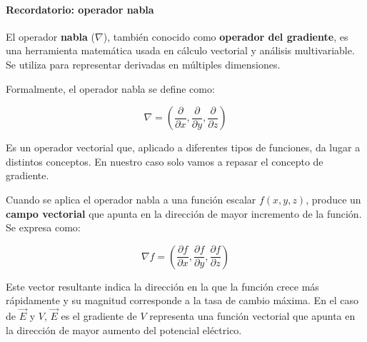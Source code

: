 \paragraph{Recordatorio: operador nabla}

El operador \textbf{nabla} (\(\nabla\)), también conocido como \textbf{operador del gradiente}, es una herramienta matemática usada en cálculo vectorial y análisis multivariable. Se utiliza para representar derivadas en múltiples dimensiones.

Formalmente, el operador nabla se define como:

\[
\nabla = \left( \frac{\partial}{\partial x}, \frac{\partial}{\partial y}, \frac{\partial}{\partial z} \right)
\]

Es un operador vectorial que, aplicado a diferentes tipos de funciones, da lugar a distintos conceptos. En nuestro caso solo vamos a repasar el concepto de gradiente.

Cuando se aplica el operador nabla a una función escalar \( f(x, y, z) \), produce un \textbf{campo vectorial} que apunta en la dirección de mayor incremento de la función. Se expresa como:

\[
\nabla f = \left( \frac{\partial f}{\partial x}, \frac{\partial f}{\partial y}, \frac{\partial f}{\partial z} \right)
\]

Este vector resultante indica la dirección en la que la función crece más rápidamente y su magnitud corresponde a la tasa de cambio máxima. En el caso de \(\vec{E}\) y \(V\), \(\vec{E}\) es el gradiente de \(V\) representa una función vectorial que apunta en la dirección de mayor aumento del potencial eléctrico.

